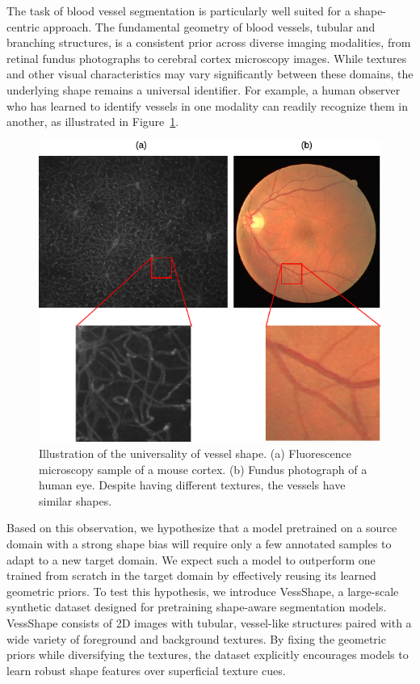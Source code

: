 \documentclass[%
reprint,
nofootinbib,
 amsmath,amssymb,
aps,
superscriptaddress,
showkeys,
longbibliography
]{revtex4-1}
\begin{document}
The task of blood vessel segmentation is particularly well suited for a shape-centric approach. The fundamental geometry of blood vessels, tubular and branching structures, is a consistent prior across diverse imaging modalities, from retinal fundus photographs to cerebral cortex microscopy images. While textures and other visual characteristics may vary significantly between these domains, the underlying shape remains a universal identifier. For example, a human observer who has learned to identify vessels in one modality can readily recognize them in another, as illustrated in Figure~\ref{f:motivation}.

\begin{figure}[tbp]
    \centering
    \includegraphics[width=\columnwidth]{figures/vessel_retinal_cortex.pdf}
    \caption{Illustration of the universality of vessel shape. (a) Fluorescence microscopy sample of a mouse cortex. (b) Fundus photograph of a human eye. Despite having different textures, the vessels have similar shapes.}
    \label{f:motivation}
\end{figure}

Based on this observation, we hypothesize that a model pretrained on a source domain with a strong shape bias will require only a few annotated samples to adapt to a new target domain. We expect such a model to outperform one trained from scratch in the target domain by effectively reusing its learned geometric priors. To test this hypothesis, we introduce VessShape, a large-scale synthetic dataset designed for pretraining shape-aware segmentation models. VessShape consists of 2D images with tubular, vessel-like structures paired with a wide variety of foreground and background textures. By fixing the geometric priors while diversifying the textures, the dataset explicitly encourages models to learn robust shape features over superficial texture cues.
\end{document}
